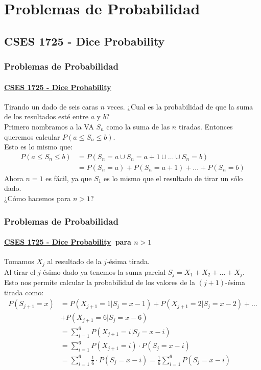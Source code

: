 \documentclass[../main.tex]{subfiles}
\begin{document}
\newcommand{\SECTIONB}{Problemas de Probabilidad}
\section{\SECTIONB}

\newcommand{\EJA}{\href{https://cses.fi/problemset/task/1725/}{CSES 1725 - Dice Probability}}
\subsection{CSES 1725 - Dice Probability}

\begin{frame}
  \frametitle{\SECTIONB}
  \framesubtitle{\EJA}

  Tirando un dado de seis caras \(n\) veces. ¿Cual es la probabilidad de que la suma de los resultados esté entre \(a\) y \(b\)? \pause \\
  Primero nombramos a la VA \(S_{n}\) como la suma de las \(n\) tiradas. Entonces queremos calcular \(P(a \leq S_{n} \leq b)\). \pause \\
  Esto es lo mismo que:
  \begin{align*}
    P(a \leq S_{n} \leq b) &= P(S_{n} = a \cup S_{n} = a+1 \cup \ldots \cup S_{n} = b) \\
                           &= P(S_{n} = a) + P(S_{n} = a+1) + \ldots + P(S_{n} = b)
  \end{align*} \pause
  Ahora \(n = 1\) es fácil, ya que \(S_{1}\) es lo mismo que el resultado de tirar un sólo dado. \\
  ¿Cómo hacemos para \(n > 1\)?

\end{frame}

\begin{frame}
  \frametitle{\SECTIONB}
  \framesubtitle{\EJA\ para \(n > 1\)}

  Tomamos \(X_{j}\) al resultado de la \(j\)-ésima tirada. \\
  Al tirar el \(j\)-ésimo dado ya tenemos la suma parcial \(S_{j} = X_{1} + X_{2} + \ldots + X_{j}\). \pause \\
  Esto nos permite calcular la probabilidad de los valores de la \((j+1)\)-ésima tirada como:
  {\small
  \begin{align*}
    P(S_{j+1} = x) &= P(X_{j+1} = 1 | S_{j} = x - 1) + P(X_{j+1} = 2 | S_{j} = x - 2) + \ldots \\
                  & + P(X_{j+1} = 6 | S_{j} = x - 6)  \\
                  &= \sum_{i = 1}^{6}P(X_{j+1} = i | S_{j} = x - i) \\
                  &= \sum_{i = 1}^{6}P(X_{j+1} = i) \cdot P(S_{j} = x - i) \\
                  &= \sum_{i = 1}^{6}\frac{1}{6} \cdot P(S_{j} = x - i) = \frac{1}{6}\sum_{i = 1}^{6}P(S_{j} = x - i) \\
  \end{align*}
  }%
\end{frame}
\end{document}
